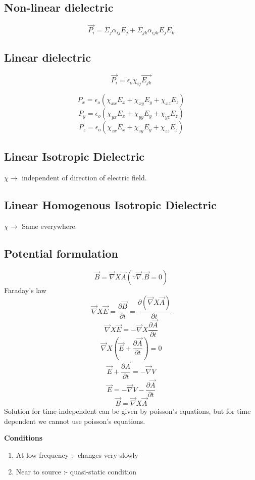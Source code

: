 \subsection*{Non-linear dielectric}

\[
    \vec{P_{i}} = \Sigma_j \alpha_{ij} E_j + \Sigma_{jk} \alpha_{ijk} E_{j} E_{k}  
\]
\subsection*{Linear dielectric}
\[
    \vec{P_{i} } = \epsilon_{o} \chi_{ij}\vec{E_{jk} } 
\]
\begin{eg}
    \[
        P_{x} = \epsilon_o (\chi_{xx}{E_{x}}+\chi_{xy}E_{y} +\chi_{xz}E_{z})
    \]
    \[
        P_y = \epsilon_{o} (\chi_{yx}E_{x} +\chi_{yy}E_{y}+\chi_{yz}E_{z}  )
    \]
    \[
        P_{z} = \epsilon_o(\chi_{zx}E_x + \chi_{zy}E_{y} +\chi_{zz} E_{z} )
    \]

\end{eg}
\subsection*{Linear Isotropic Dielectric}
\(\chi \to \) independent of direction of electric field. 
\subsection*{Linear Homogenous Isotropic Dielectric}
\(\chi \to \) Same everywhere. 
\subsection*{Potential formulation}
\[
    \vec{B} = \vec{\nabla}X\vec{A} \left(\because \vec{\nabla}.\vec{B}=0\right)
\]
Faraday's law
\[
  \vec{\nabla}X\vec{E} = \frac{\partial \vec{B}}{\partial t}  = \frac{\partial (\vec{\nabla}X\vec{A})}{\partial t}
\]
\[
    \vec{\nabla} X \vec{E} = -\vec{\nabla}X\frac{\partial \vec{A}}{\partial t }
\]
\[
    \vec{\nabla} X \left(\vec{E} + \frac{\partial \vec{A}}{\partial t}\right) = 0
\]
\[
    \vec{E} + \frac{\partial \vec{A}}{\partial t} = - \vec{\nabla}V
\]
\[
    \vec{E} = -\vec{\nabla}V - \frac{\partial \vec{A}}{\partial t}
\]
\[
    \vec{B} = \vec{\nabla}X\vec{A}
\]
Solution for time-independent can be given by poisson's equations, but for time dependent we cannot use poisson's equations. 

\textbf{Conditions} 
\begin{enumerate}
    \item At low frequency :- changes very slowly
    \item Near to source :- quasi-static condition
\end{enumerate}
